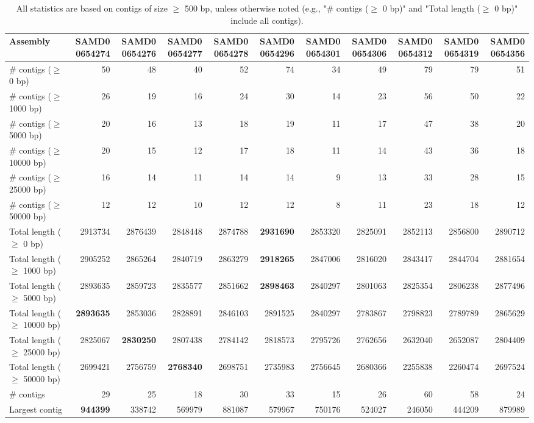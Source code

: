 \documentclass[12pt,a4paper]{article}
\begin{document}
\begin{table}[ht]
\begin{center}
\caption{All statistics are based on contigs of size $\geq$ 500 bp, unless otherwise noted (e.g., "\# contigs ($\geq$ 0 bp)" and "Total length ($\geq$ 0 bp)" include all contigs).}
\begin{tabular}{|l*{10}{|r}|}
\hline
Assembly & SAMD00654274 & SAMD00654276 & SAMD00654277 & SAMD00654278 & SAMD00654296 & SAMD00654301 & SAMD00654306 & SAMD00654312 & SAMD00654319 & SAMD00654356 \\ \hline
\# contigs ($\geq$ 0 bp) & 50 & 48 & 40 & 52 & 74 & 34 & 49 & 79 & 79 & 51 \\ \hline
\# contigs ($\geq$ 1000 bp) & 26 & 19 & 16 & 24 & 30 & 14 & 23 & 56 & 50 & 22 \\ \hline
\# contigs ($\geq$ 5000 bp) & 20 & 16 & 13 & 18 & 19 & 11 & 17 & 47 & 38 & 20 \\ \hline
\# contigs ($\geq$ 10000 bp) & 20 & 15 & 12 & 17 & 18 & 11 & 14 & 43 & 36 & 18 \\ \hline
\# contigs ($\geq$ 25000 bp) & 16 & 14 & 11 & 14 & 14 & 9 & 13 & 33 & 28 & 15 \\ \hline
\# contigs ($\geq$ 50000 bp) & 12 & 12 & 10 & 12 & 12 & 8 & 11 & 23 & 18 & 12 \\ \hline
Total length ($\geq$ 0 bp) & 2913734 & 2876439 & 2848448 & 2874788 & {\bf 2931690} & 2853320 & 2825091 & 2852113 & 2856800 & 2890712 \\ \hline
Total length ($\geq$ 1000 bp) & 2905252 & 2865264 & 2840719 & 2863279 & {\bf 2918265} & 2847006 & 2816020 & 2843417 & 2844704 & 2881654 \\ \hline
Total length ($\geq$ 5000 bp) & 2893635 & 2859723 & 2835577 & 2851662 & {\bf 2898463} & 2840297 & 2801063 & 2825354 & 2806238 & 2877496 \\ \hline
Total length ($\geq$ 10000 bp) & {\bf 2893635} & 2853036 & 2828891 & 2846103 & 2891525 & 2840297 & 2783867 & 2798823 & 2789789 & 2865629 \\ \hline
Total length ($\geq$ 25000 bp) & 2825067 & {\bf 2830250} & 2807438 & 2784142 & 2818573 & 2795726 & 2762656 & 2632040 & 2652087 & 2804409 \\ \hline
Total length ($\geq$ 50000 bp) & 2699421 & 2756759 & {\bf 2768340} & 2698751 & 2735983 & 2756645 & 2680366 & 2255838 & 2260474 & 2697524 \\ \hline
\# contigs & 29 & 25 & 18 & 30 & 33 & 15 & 26 & 60 & 58 & 24 \\ \hline
Largest contig & {\bf 944399} & 338742 & 569979 & 881087 & 579967 & 750176 & 524027 & 246050 & 444209 & 879989 \\ \hline

\end{tabular}
\end{center}
\end{table}
\end{document}
